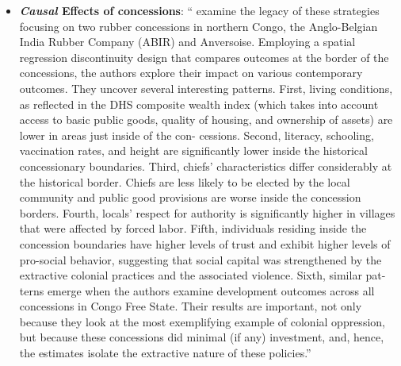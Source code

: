 \documentclass[11pt,a4paper]{article}
\begin{document}
\begin{itemize}
		\item \textbf{\emph{Causal} Effects of concessions}: ``\textcite{Lowes2020} examine the legacy of these strategies focusing on two rubber concessions in northern Congo, the Anglo-Belgian India Rubber Company (ABIR) and Anversoise. Employing a spatial regression discontinuity design that compares outcomes at the border of the concessions, the authors explore their impact on various contemporary outcomes. They uncover several interesting patterns. First, living conditions, as reflected in the DHS composite wealth index (which takes into account access to basic public goods, quality of housing, and ownership of assets) are lower in areas just inside of the con- cessions. Second, literacy, schooling, vaccination rates, and height are significantly lower inside the historical concessionary boundaries. Third, chiefs’ characteristics differ considerably at the historical border. Chiefs are less likely to be elected by the local community and public good provisions are worse inside the concession borders. Fourth, locals’ respect for authority is significantly higher in villages that were affected by forced labor. Fifth, individuals residing inside the concession boundaries have higher levels of trust and exhibit higher levels of pro-social behavior, suggesting that social capital was strengthened by the extractive colonial practices and the associated violence. Sixth, similar pat- terns emerge when the authors examine development outcomes across all concessions in Congo Free State. Their results are important, not only because they look at the most exemplifying example of colonial oppression, but because these concessions did minimal (if any) investment, and, hence, the estimates isolate the extractive nature of these policies.'' \parencite[64]{Michalopoulos2020}
	\end{itemize}
	\clearpage
	\printbibliography
	
\end{document}
